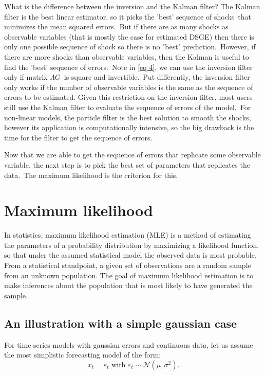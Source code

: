 \documentclass[a4paper,12pt]{article}%
\begin{document}
What is the difference between the inversion and the Kalman filter? The Kalman
filter is the best linear estimator, so it picks the 'best' sequence of
shocks\ that minimizes the mean squared errors.\ But if there are as many
shocks as observable variables (that is mostly the case for estimated DSGE)
then there is only one possible sequence of shock so there is no "best"
prediction.\ However, if there are more shocks than observable variables, then
the Kalman is useful to find the 'best' sequence of errors.\ Note in
\autoref{eq 4}, we can use the inversion filter only if matrix $\Lambda G$\ is
square and invertible.\ Put differently, the inversion filter only works if
the number of observable variables is the same as the sequence of errors to be
estimated. Given this restriction on the inversion filter, most users still use the
Kalman filter to evaluate the sequence of errors of the model.\ For non-linear
models, the particle filter is the best solution to smooth the shocks, however
its application is computationally intensive, so the big drawback is the time
for the filter to get the sequence of errors.

Now that we are able to get the sequence of errors that replicate some
observable variable, the next step is to pick the best set of parameters that
replicates the data.\ The maximum likelihood is the criterion for this.

\newpage

\section{Maximum likelihood}

In statistics, maximum likelihood estimation (MLE) is a method of estimating
the parameters of a probability distribution by maximizing a likelihood
function, so that under the assumed statistical model the observed data is
most probable. From a statistical standpoint, a given set of observations are
a random sample from an unknown population. The goal of maximum likelihood
estimation is to make inferences about the population that is most likely to
have generated the sample.

\subsection{An illustration with a simple gaussian case}

For time series models with gaussian errors and continuous data, let us assume
the most simplistic forecasting model of the form:%
\[
x_{t}=\varepsilon_{t}\text{ with }\varepsilon_{t}\sim\mathcal{N}(\mu
,\sigma^{2}).
\]
\end{document}
